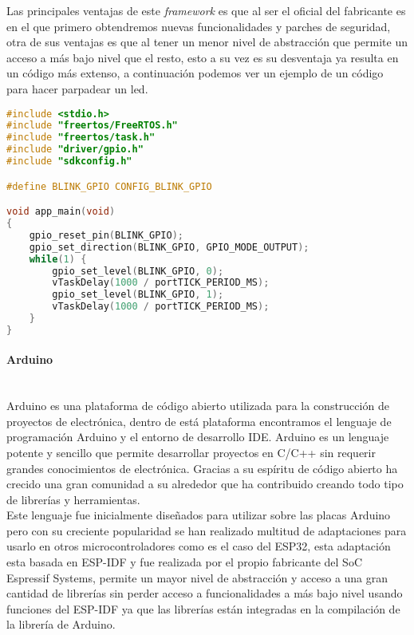 \documentclass[../proyecto.tex]{subfiles}
\begin{document}
 Las principales ventajas de este \textit{framework} es que al ser el oficial del fabricante es en el que primero obtendremos nuevas funcionalidades y parches de seguridad, otra de sus ventajas es que al tener un menor nivel de abstracción que permite un acceso a más bajo nivel que el resto, esto a su vez es su desventaja ya resulta en un código más extenso, a continuación podemos ver un ejemplo de un código para hacer parpadear un led.\\

\begin{minipage}{\linewidth}
\begin{lstlisting}[language=C, caption=Ejemplo de código para hacer parpadear un led con ESP-IDF, captionpos=b, frame=single]
#include <stdio.h>
#include "freertos/FreeRTOS.h"
#include "freertos/task.h"
#include "driver/gpio.h"
#include "sdkconfig.h"

#define BLINK_GPIO CONFIG_BLINK_GPIO

void app_main(void)
{
    gpio_reset_pin(BLINK_GPIO);
    gpio_set_direction(BLINK_GPIO, GPIO_MODE_OUTPUT);
    while(1) {
        gpio_set_level(BLINK_GPIO, 0);
        vTaskDelay(1000 / portTICK_PERIOD_MS);
        gpio_set_level(BLINK_GPIO, 1);
        vTaskDelay(1000 / portTICK_PERIOD_MS);
    }
}
\end{lstlisting}
\end{minipage}

\paragraph{Arduino}\mbox{}\\
Arduino es una plataforma de código abierto utilizada para la construcción de proyectos de electrónica, dentro de está plataforma encontramos el lenguaje de programación Arduino y el entorno de desarrollo IDE. Arduino es un lenguaje potente y sencillo que permite desarrollar proyectos en C/C++ sin requerir grandes conocimientos de electrónica. Gracias a su espíritu de código abierto ha crecido una gran comunidad a su alrededor que ha contribuido creando todo tipo de librerías y herramientas.\\

Este lenguaje fue inicialmente diseñados para utilizar sobre las placas Arduino pero con su creciente popularidad se han realizado multitud de adaptaciones para usarlo en otros microcontroladores como es el caso del ESP32, esta adaptación esta basada en ESP-IDF y fue realizada por el propio fabricante del SoC Espressif Systems, permite un mayor nivel de abstracción y acceso a una gran cantidad de librerías sin perder acceso a funcionalidades a más bajo nivel usando funciones del ESP-IDF ya que las librerías están integradas en la compilación de la librería de Arduino.\\
\end{document}
